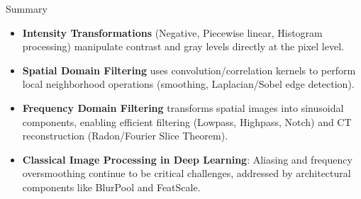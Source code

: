 \documentclass[aspectratio=169,10pt]{beamer}
\begin{document}
\begin{frame}{Summary}
\begin{itemize}
\item \textbf{Intensity Transformations} (Negative, Piecewise linear, Histogram processing) manipulate contrast and gray levels directly at the pixel level.
\vspace{0.5em}
\item \textbf{Spatial Domain Filtering} uses convolution/correlation kernels to perform local neighborhood operations (smoothing, Laplacian/Sobel edge detection).
\vspace{0.5em}
\item \textbf{Frequency Domain Filtering} transforms spatial images into sinusoidal components, enabling efficient filtering (Lowpass, Highpass, Notch) and CT reconstruction (Radon/Fourier Slice Theorem).
\vspace{0.5em}
\item \textbf{Classical Image Processing in Deep Learning}: Aliasing and frequency oversmoothing continue to be critical challenges, addressed by architectural components like BlurPool and FeatScale.
\end{itemize}
\end{frame}
\end{document}
